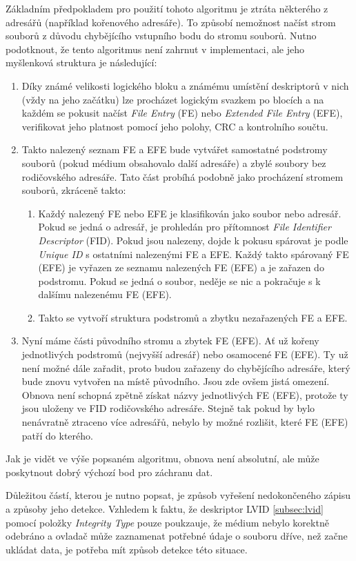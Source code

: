 Základním předpokladem pro použití tohoto algoritmu je ztráta některého z adresářů (například kořenového adresáře). To způsobí nemožnost načíst strom souborů z důvodu chybějícího vstupního bodu do stromu souborů. Nutno podotknout, že tento algoritmus není zahrnut v implementaci, ale jeho myšlenková struktura je následující:
\begin{enumerate}
    \item Díky známé velikosti logického bloku a známému umístění deskriptorů v nich (vždy na jeho začátku) lze procházet logickým svazkem po blocích a na každém se pokusit načíst \textit{File Entry} (FE) nebo \textit{Extended File Entry} (EFE), verifikovat jeho platnost pomocí jeho polohy, CRC a kontrolního součtu.
    \item Takto nalezený seznam FE a EFE bude vytvářet samostatné podstromy souborů (pokud médium obsahovalo další adresáře) a zbylé soubory bez rodičovského adresáře. Tato část probíhá podobně jako procházení stromem souborů, zkráceně takto:
    \begin{enumerate}
        \item Každý nalezený FE nebo EFE je klasifikován jako soubor nebo adresář. Pokud se jedná o adresář, je prohledán pro přítomnost \textit{File Identifier Descriptor} (FID). Pokud jsou nalezeny, dojde k pokusu spárovat je podle \textit{Unique ID} s ostatními nalezenými FE a EFE. Každý takto spárovaný FE (EFE) je vyřazen ze seznamu nalezených FE (EFE) a je zařazen do podstromu. Pokud se jedná o soubor, neděje se nic a pokračuje s k dalšímu nalezenému FE (EFE).
        \item Takto se vytvoří struktura podstromů a zbytku nezařazených FE a EFE.
    \end{enumerate}
    \item Nyní máme části původního stromu a zbytek FE (EFE). Ať už kořeny jednotlivých podstromů (nejvyšší adresář) nebo osamocené FE (EFE). Ty už není možné dále zařadit, proto budou zařazeny do chybějícího adresáře, který bude znovu vytvořen na místě původního. Jsou zde ovšem jistá omezení. Obnova není schopná zpětně získat názvy jednotlivých FE (EFE), protože ty jsou uloženy ve FID rodičovského adresáře. Stejně tak pokud by bylo nenávratně ztraceno více adresářů, nebylo by možné rozlišit, které FE (EFE) patří do kterého. 
\end{enumerate}
Jak je vidět ve výše popsaném algoritmu, obnova není absolutní, ale může poskytnout dobrý výchozí bod pro záchranu dat.

Důležitou částí, kterou je nutno popsat, je způsob vyřešení nedokončeného zápisu a způsoby jeho detekce. Vzhledem k faktu, že deskriptor LVID \ref{subsec:lvid} pomocí položky \textit{Integrity Type} pouze poukzauje, že médium nebylo korektně odebráno a ovladač může zaznamenat potřebné údaje o souboru dříve, než začne ukládat data, je potřeba mít způsob detekce této situace.

